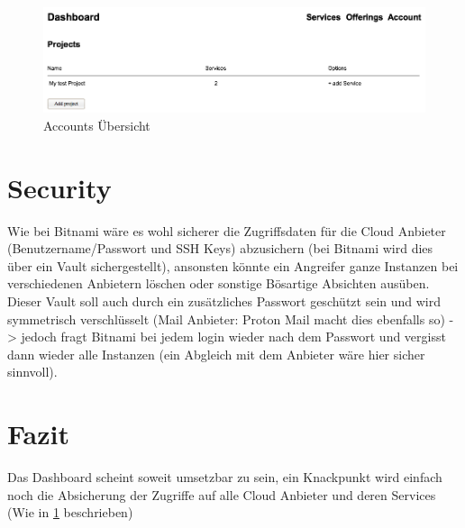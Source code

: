 \begin{figure}[!htbp]
\includegraphics[width=\textwidth]{./03_Analyse/03_Dashboard/images/account_projects.png}
\caption{Accounts Übersicht}
\end{figure}

\section{Security}
\label{Dashboard:Security}
Wie bei Bitnami wäre es wohl sicherer die Zugriffsdaten für die Cloud Anbieter 
(Benutzername/Passwort und SSH Keys)
abzusichern (bei Bitnami wird dies über ein Vault sichergestellt), ansonsten 
könnte ein Angreifer ganze Instanzen bei verschiedenen Anbietern löschen oder 
sonstige Bösartige Absichten ausüben.
\newline
Dieser Vault soll auch durch ein zusätzliches Passwort geschützt sein und 
wird symmetrisch verschlüsselt (Mail Anbieter: Proton Mail\autocite{proton} macht dies ebenfalls 
so) -> jedoch fragt Bitnami bei jedem login wieder nach dem Passwort und 
vergisst dann wieder alle Instanzen (ein Abgleich mit dem Anbieter wäre hier sicher sinnvoll).

\section{Fazit}
Das Dashboard scheint soweit umsetzbar zu sein, ein Knackpunkt wird 
einfach noch die Absicherung der Zugriffe auf alle Cloud Anbieter und deren 
Services (Wie in \ref{Dashboard:Security} beschrieben)



